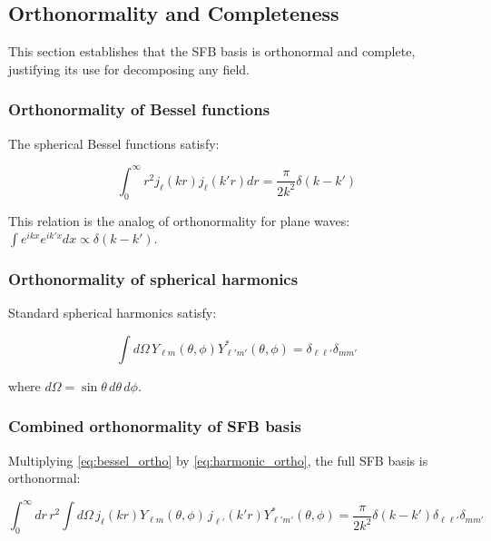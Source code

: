 \subsection{Orthonormality and Completeness}\label{subsec:sfb_orthonormality}

This section establishes that the SFB basis is orthonormal and complete, justifying its use for decomposing any field.

\subsubsection{Orthonormality of Bessel functions}

The spherical Bessel functions satisfy:

\begin{equation}
\int_0^\infty r^2 j_\ell(kr) j_\ell(k'r) dr = \frac{\pi}{2k^2} \delta(k - k')
\label{eq:bessel_ortho}
\end{equation}

This relation is the analog of orthonormality for plane waves: $\int e^{ikx} e^{ik'x} dx \propto \delta(k-k')$.

\subsubsection{Orthonormality of spherical harmonics}

Standard spherical harmonics satisfy:

\begin{equation}
\int d\Omega \, Y_{\ell m}(\theta, \phi) Y^*_{\ell' m'}(\theta, \phi) = \delta_{\ell\ell'} \delta_{mm'}
\label{eq:harmonic_ortho}
\end{equation}

where $d\Omega = \sin\theta \, d\theta \, d\phi$.

\subsubsection{Combined orthonormality of SFB basis}

Multiplying \cref{eq:bessel_ortho} by \cref{eq:harmonic_ortho}, the full SFB basis is orthonormal:

\begin{equation}
\int_0^\infty dr \, r^2 \int d\Omega \, 
j_\ell(kr) Y_{\ell m}(\theta, \phi) \, j_{\ell'}(k'r) Y^*_{\ell' m'}(\theta, \phi)
= \frac{\pi}{2k^2} \delta(k-k') \delta_{\ell\ell'} \delta_{mm'}
\label{eq:sfb_ortho_full}
\end{equation}

